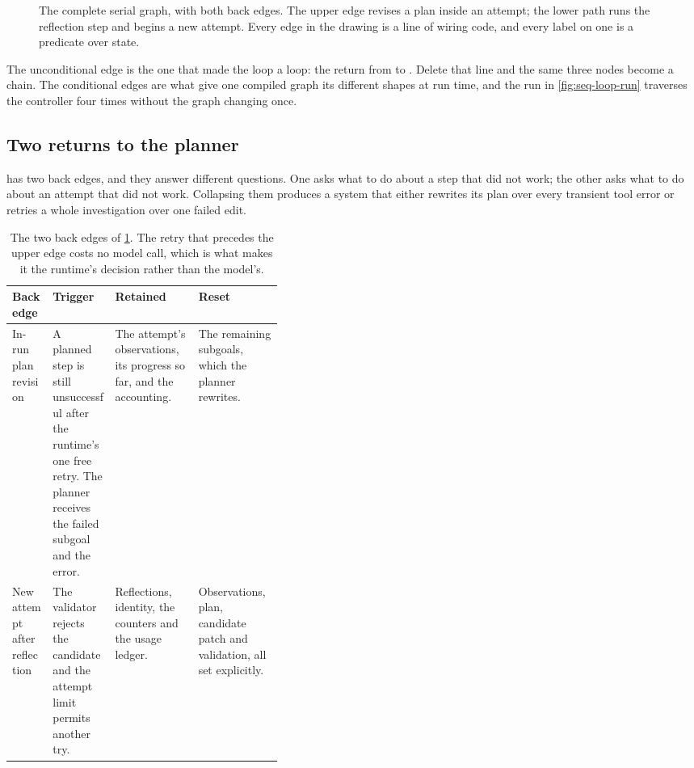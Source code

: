 \begin{figure}[htbp]
  \centering
  
  \caption{The complete serial graph, with both back edges. The upper edge revises a plan inside an
  attempt; the lower path runs the reflection step and begins a new attempt. Every edge in the
  drawing is a line of wiring code, and every label on one is a predicate over state.}
  \label{fig:control-graph}
\end{figure}

The unconditional edge is the one that made the loop a loop: the return from  to
. Delete that line and the same three nodes become a chain. The conditional
edges are what give one compiled graph its different shapes at run time, and the run in
\cref{fig:seq-loop-run} traverses the controller four times without the graph changing once.

\subsection{Two returns to the planner}
\label{sec:control-backedges}

 has two back edges, and they answer different questions. One asks what to
do about a step that did not work; the other asks what to do about an attempt that did not work.
Collapsing them produces a system that either rewrites its plan over every transient tool error or
retries a whole investigation over one failed edit.

\begin{table}[htbp]
  \centering
  \begin{tabularx}{\linewidth}{@{}p{0.155\linewidth}p{0.235\linewidth}XX@{}}
    \toprule
    \textbf{Back edge} & \textbf{Trigger} & \textbf{Retained} & \textbf{Reset} \\
    \midrule
    In-run plan revision & A planned step is still unsuccessful after the runtime's one free retry.
      The planner receives the failed subgoal and the error. & The attempt's observations, its
      progress so far, and the accounting. & The remaining subgoals, which the planner rewrites. \\
    New attempt after reflection & The validator rejects the candidate and the attempt limit
      permits another try. & Reflections, identity, the counters and the usage ledger. &
      Observations, plan, candidate patch and validation, all set explicitly. \\
    \bottomrule
  \end{tabularx}
  \caption{The two back edges of \cref{fig:control-graph}. The retry that precedes the upper edge
  costs no model call, which is what makes it the runtime's decision rather than the model's.}
  \label{tab:control-backedges}
\end{table}

